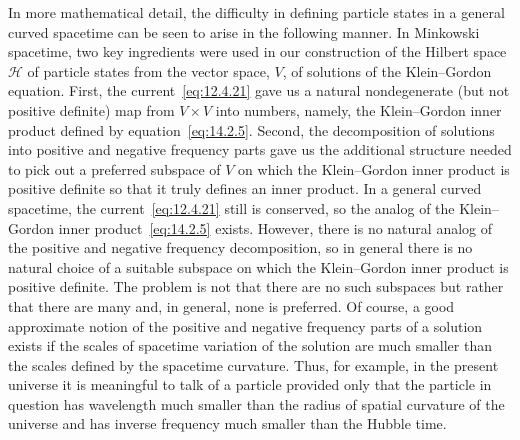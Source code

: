 In more mathematical detail, the difficulty in defining particle states in a general
curved spacetime can be seen to arise in the following manner. In Minkowski
spacetime, two key ingredients were used in our construction of the Hilbert space
\(\mathcal H\) of particle states from the vector space, \(V\), of solutions of the
Klein--Gordon equation. First, the current~\eqref{eq:12.4.21} gave us a natural
nondegenerate (but not positive definite) map from \(V\times V\) into numbers,
namely, the Klein--Gordon inner product defined by equation~\eqref{eq:14.2.5}.
Second, the decomposition of solutions into positive and negative frequency parts
gave us the additional structure needed to pick out a preferred subspace of \(V\) on
which the Klein--Gordon inner product is positive definite so that it truly defines an
inner product. In a general curved spacetime, the current~\eqref{eq:12.4.21} still is
conserved, so the analog of the Klein--Gordon inner product~\eqref{eq:14.2.5}
exists. However, there is no natural analog of the positive and negative frequency
decomposition, so in general there is no natural choice of a suitable subspace on
which the Klein--Gordon inner product is positive definite. The problem is not that
there are no such subspaces but rather that there are many and, in general, none is
preferred. Of course, a good approximate notion of the positive and negative
frequency parts of a solution exists if the scales of spacetime variation of the solution
are much smaller than the scales defined by the spacetime curvature. Thus, for
example, in the present universe it is meaningful to talk of a particle provided only
that the particle in question has wavelength much smaller than the radius of spatial
curvature of the universe and has inverse frequency much smaller than the Hubble
time.

